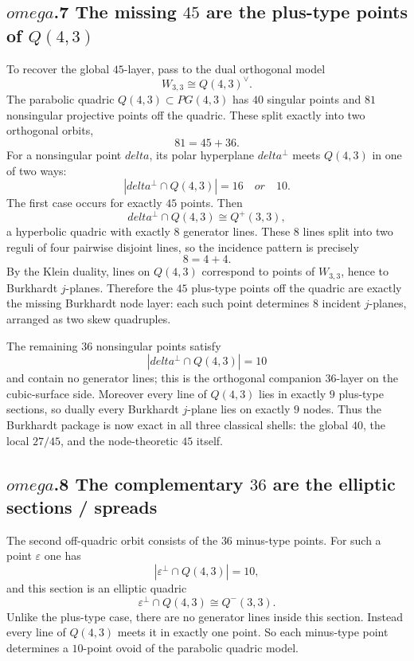 \documentclass[12pt,a4paper]{article}
\def\mathbf#1{#1}%
\def\text#1{#1}%
\def\omega{omega}%
\def\delta{delta}%
\theoremstyle{definition}
\begin{document}
\subsection*{$\omega$.7 \quad The missing $45$ are the plus-type points of $Q(4,3)$}
To recover the global $45$-layer, pass to the dual orthogonal model
\[
W_{3,3} \cong Q(4,3)^{\vee}.
\]
The parabolic quadric $Q(4,3)\subset \mathbf{PG}(4,3)$ has $40$ singular
points and $81$ nonsingular projective points off the quadric.  These split
exactly into two orthogonal orbits,
\[
81 = 45 + 36.
\]
For a nonsingular point $\delta$, its polar hyperplane $\delta^{\perp}$ meets
$Q(4,3)$ in one of two ways:
\[
|\delta^{\perp}\cap Q(4,3)| = 16 \quad \text{or} \quad 10.
\]
The first case occurs for exactly $45$ points.  Then
\[
\delta^{\perp}\cap Q(4,3) \cong Q^{+}(3,3),
\]
a hyperbolic quadric with exactly $8$ generator lines.  These $8$ lines split
into two reguli of four pairwise disjoint lines, so the incidence pattern is
precisely
\[
8 = 4 + 4.
\]
By the Klein duality, lines on $Q(4,3)$ correspond to points of $W_{3,3}$,
hence to Burkhardt $j$-planes.  Therefore the $45$ plus-type points off the
quadric are exactly the missing Burkhardt node layer: each such point determines
$8$ incident $j$-planes, arranged as two skew quadruples.

The remaining $36$ nonsingular points satisfy
\[
|\delta^{\perp}\cap Q(4,3)| = 10
\]
and contain no generator lines; this is the orthogonal companion $36$-layer on
the cubic-surface side.  Moreover every line of $Q(4,3)$ lies in exactly $9$
plus-type sections, so dually every Burkhardt $j$-plane lies on exactly $9$
nodes.  Thus the Burkhardt package is now exact in all three classical shells:
the global $40$, the local $27/45$, and the node-theoretic $45$ itself.

\subsection*{$\omega$.8 \quad The complementary $36$ are the elliptic sections / spreads}
The second off-quadric orbit consists of the $36$ minus-type points.  For such
a point $\varepsilon$ one has
\[
|\varepsilon^{\perp}\cap Q(4,3)| = 10,
\]
and this section is an elliptic quadric
\[
\varepsilon^{\perp}\cap Q(4,3) \cong Q^{-}(3,3).
\]
Unlike the plus-type case, there are no generator lines inside this section.
Instead every line of $Q(4,3)$ meets it in exactly one point.  So each
minus-type point determines a $10$-point ovoid of the parabolic quadric model.
\end{document}
